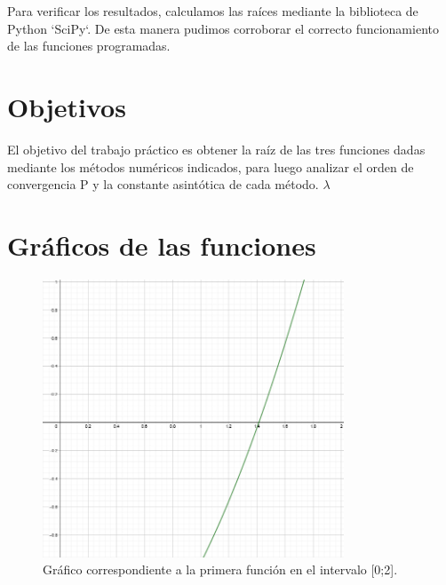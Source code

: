 \documentclass[titlepage,a4paper]{article}
\begin{document}
Para verificar los resultados, calculamos las raíces mediante la biblioteca de Python `SciPy`. De esta manera pudimos corroborar el correcto funcionamiento de las funciones programadas.

\section{Objetivos}\label{sec:objetivos}
El objetivo del trabajo práctico es obtener la raíz de las tres funciones dadas mediante los métodos numéricos indicados, para luego analizar el orden de convergencia P y la constante asintótica de cada método. $\lambda$


\section{Gráficos de las funciones}\label{sec:graficosfun}

\begin{figure}[H]
    \centering
    \includegraphics[width=0.8\textwidth]{funcion1.png}
    \caption{\label{fig:f1}Gráfico correspondiente a la primera función en el intervalo [0;2].}
\end{figure}
\end{document}
